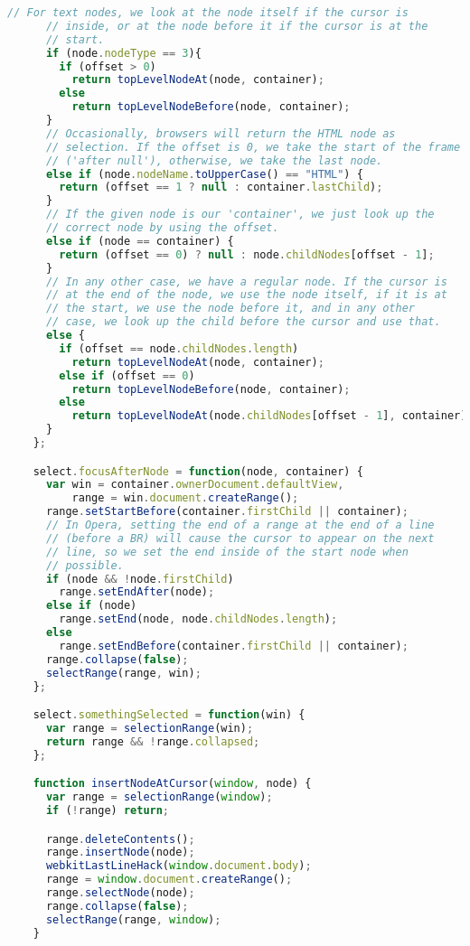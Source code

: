 \begin{lstlisting}[language=Javascript]
      // For text nodes, we look at the node itself if the cursor is
      // inside, or at the node before it if the cursor is at the
      // start.
      if (node.nodeType == 3){
        if (offset > 0)
          return topLevelNodeAt(node, container);
        else
          return topLevelNodeBefore(node, container);
      }
      // Occasionally, browsers will return the HTML node as
      // selection. If the offset is 0, we take the start of the frame
      // ('after null'), otherwise, we take the last node.
      else if (node.nodeName.toUpperCase() == "HTML") {
        return (offset == 1 ? null : container.lastChild);
      }
      // If the given node is our 'container', we just look up the
      // correct node by using the offset.
      else if (node == container) {
        return (offset == 0) ? null : node.childNodes[offset - 1];
      }
      // In any other case, we have a regular node. If the cursor is
      // at the end of the node, we use the node itself, if it is at
      // the start, we use the node before it, and in any other
      // case, we look up the child before the cursor and use that.
      else {
        if (offset == node.childNodes.length)
          return topLevelNodeAt(node, container);
        else if (offset == 0)
          return topLevelNodeBefore(node, container);
        else
          return topLevelNodeAt(node.childNodes[offset - 1], container);
      }
    };

    select.focusAfterNode = function(node, container) {
      var win = container.ownerDocument.defaultView,
          range = win.document.createRange();
      range.setStartBefore(container.firstChild || container);
      // In Opera, setting the end of a range at the end of a line
      // (before a BR) will cause the cursor to appear on the next
      // line, so we set the end inside of the start node when
      // possible.
      if (node && !node.firstChild)
        range.setEndAfter(node);
      else if (node)
        range.setEnd(node, node.childNodes.length);
      else
        range.setEndBefore(container.firstChild || container);
      range.collapse(false);
      selectRange(range, win);
    };

    select.somethingSelected = function(win) {
      var range = selectionRange(win);
      return range && !range.collapsed;
    };

    function insertNodeAtCursor(window, node) {
      var range = selectionRange(window);
      if (!range) return;

      range.deleteContents();
      range.insertNode(node);
      webkitLastLineHack(window.document.body);
      range = window.document.createRange();
      range.selectNode(node);
      range.collapse(false);
      selectRange(range, window);
    }


\end{lstlisting}
